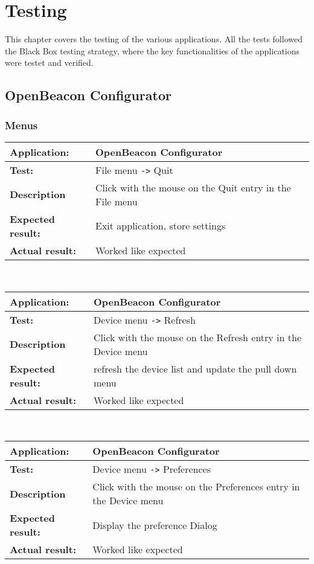\chapter{Testing}
 This chapter covers the testing of the various applications. All the tests followed the Black Box testing strategy, where the key functionalities of the applications were testet and verified.

 \section{OpenBeacon Configurator}
  \subsection{Menus}
   \begin{tabular}{|p{3.5cm}|p{10.5cm}|}
    \hline
     \textbf{Application:}	& OpenBeacon Configurator\\
    \hline
     \textbf{Test:}		& File menu \verb=->= Quit\\
    \hline
     \textbf{Description}	& Click with the mouse on the Quit entry in the File menu\\
    \hline
     \textbf{Expected result:}	& Exit application, store settings\\
    \hline
     \textbf{Actual result:}	& Worked like expected\\
    \hline
   \end{tabular}\\
   \begin{tabular}{|p{3.5cm}|p{10.5cm}|}
    \hline
     \textbf{Application:}	& OpenBeacon Configurator\\
    \hline
     \textbf{Test:}		& Device menu \verb=->= Refresh\\
    \hline
     \textbf{Description}	& Click with the mouse on the Refresh entry in the Device menu\\
    \hline
     \textbf{Expected result:}	& refresh the device list and update the pull down menu\\
    \hline
     \textbf{Actual result:}	& Worked like expected\\
    \hline
   \end{tabular}\\
   \begin{tabular}{|p{3.5cm}|p{10.5cm}|}
    \hline
     \textbf{Application:}	& OpenBeacon Configurator\\
    \hline
     \textbf{Test:}		& Device menu \verb=->= Preferences \\
    \hline
     \textbf{Description}	& Click with the mouse on the Preferences entry in the Device menu\\
    \hline
     \textbf{Expected result:}	& Display the preference Dialog\\
    \hline
     \textbf{Actual result:}	& Worked like expected\\
    \hline
   \end{tabular}\\
